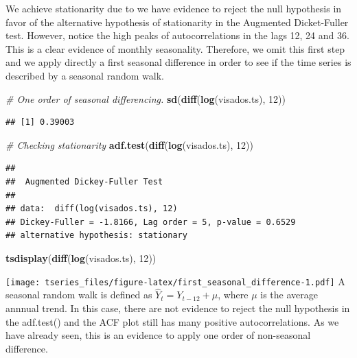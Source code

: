 \documentclass[]{article}
\newenvironment{Shaded}{\begin{snugshade}}{\end{snugshade}}
\newcommand{\KeywordTok}[1]{\textcolor[rgb]{0.13,0.29,0.53}{\textbf{{#1}}}}
\newcommand{\DecValTok}[1]{\textcolor[rgb]{0.00,0.00,0.81}{{#1}}}
\newcommand{\CommentTok}[1]{\textcolor[rgb]{0.56,0.35,0.01}{\textit{{#1}}}}
\newcommand{\NormalTok}[1]{{#1}}
\begin{document}
We achieve stationarity due to we have evidence to reject the null
hypothesis in favor of the alternative hypothesis of stationarity in the
Augmented Dicket-Fuller test. However, notice the high peaks of
autocorrelations in the lags 12, 24 and 36. This is a clear evidence of
monthly seasonality. Therefore, we omit this first step and we apply
directly a first seasonal difference in order to see if the time series
is described by a seasonal random walk.

\begin{Shaded}
\begin{Highlighting}[]
\CommentTok{# One order of seasonal differencing.}
\KeywordTok{sd}\NormalTok{(}\KeywordTok{diff}\NormalTok{(}\KeywordTok{log}\NormalTok{(visados.ts), }\DecValTok{12}\NormalTok{))}
\end{Highlighting}
\end{Shaded}

\begin{verbatim}
## [1] 0.39003
\end{verbatim}

\begin{Shaded}
\begin{Highlighting}[]
\CommentTok{# Checking stationarity}
\KeywordTok{adf.test}\NormalTok{(}\KeywordTok{diff}\NormalTok{(}\KeywordTok{log}\NormalTok{(visados.ts), }\DecValTok{12}\NormalTok{))}
\end{Highlighting}
\end{Shaded}

\begin{verbatim}
## 
##  Augmented Dickey-Fuller Test
## 
## data:  diff(log(visados.ts), 12)
## Dickey-Fuller = -1.8166, Lag order = 5, p-value = 0.6529
## alternative hypothesis: stationary
\end{verbatim}

\begin{Shaded}
\begin{Highlighting}[]
\KeywordTok{tsdisplay}\NormalTok{(}\KeywordTok{diff}\NormalTok{(}\KeywordTok{log}\NormalTok{(visados.ts), }\DecValTok{12}\NormalTok{))}
\end{Highlighting}
\end{Shaded}

\texttt{[image: tseries\_files/figure-latex/first\_seasonal\_difference-1.pdf]}
A seasonal random walk is defined as \(\hat{Y}_t = Y_{t-12} + \mu\),
where \(\mu\) is the average annnual trend. In this case, there are not
evidence to reject the null hypothesis in the adf.test() and the ACF
plot still has many positive autocorrelations. As we have already seen,
this is an evidence to apply one order of non-seasonal difference.
\end{document}
